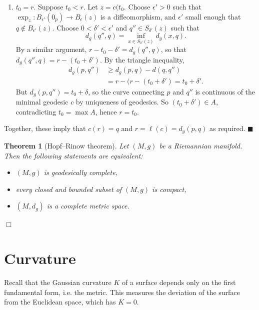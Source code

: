 \documentclass[letter-paper]{tufte-book}
\newtheorem{theorem}{\color{pastel-blue}Theorem}[section]
\newenvironment{proof}[1][Proof]{\begin{trivlist}
\item[\hskip \labelsep {\bfseries #1}]}{\end{trivlist}}
\newcommand{\qed}{\hfill$\blacksquare$}
\newcommand{\qedwhite}{\hfill \ensuremath{\Box}}
\begin{document}
\begin{proof}
\begin{enumerate}
    \item $t_0 = r$. Suppose $t_0 < r$. Let $z=c(t_0$. Choose $\epsilon' > 0$ such that $\exp_z: B_{\epsilon'}(0_p) \to B_\epsilon(z)$ is a diffeomorphism, and $\epsilon'$ small enough that $q\not\in B_{\epsilon'}(z)$. Choose $0 < \delta' < \epsilon'$ and $q'' \in S_{\delta'}(z)$ such that
    \begin{equation*}
      d_g(q'', q) = \inf_{x\in S_{\delta'}(z)}d_g(x,q).
    \end{equation*}
    By a similar argument, $r - t_0 - \delta' = d_g(q'', q)$, so that $d_g(q'',q) = r - (t_0 + \delta')$. By the triangle inequality,
    \begin{align*}
      d_g(p, q'')
        &\geq d_g(p,q) - d(q, q'')\\
        &= r - (r - (t_0 + \delta') = t_0 + \delta'.
    \end{align*}
    But $d_g(p, q'') = t_0 + \delta$, so the curve connecting $p$ and $q''$ is continuous of the minimal geodesic $c$ by uniqueness of geodesics. So $(t_0 + \delta') \in A$, contradicting $t_0 = \max A$, hence $r = t_0$.
  \end{enumerate}
  Together, these imply that $c(r) = q$ and $r=\ell(c) = d_g(p,q)$ as required. \qed
\end{proof}

\begin{theorem}[Hopf--Rinow theorem]
  Let $(M,g)$ be a Riemannian manifold. Then the following statements are equivalent:
  \begin{itemize}
    \item $(M,g)$ is geodesically complete,
    \item every closed and bounded subset of $(M,g)$ is compact,
    \item $(M, d_g)$ is a complete metric space.
  \end{itemize}
  \qedwhite
\end{theorem}


\chapter{Curvature}

Recall that the Gaussian curvature $K$ of a surface depends only on the first fundamental form, i.e. the metric. This measures the deviation of the surface from the Euclidean space, which has $K = 0$.
\end{document}
